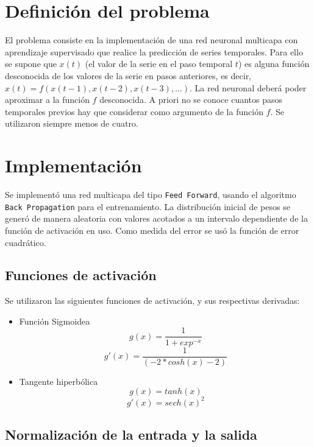 \documentclass[a4paper,10pt]{article}
\begin{document}
\setcounter{page}{1}


\section{Definición del problema}

El problema consiste en la implementación de una red neuronal multicapa con aprendizaje supervisado que realice la predicción de series temporales. Para ello se supone que $x(t)$ (el valor de la 
serie en el paso temporal $t$) es alguna función desconocida de los valores de la serie en pasos anteriores, es decir, $x(t) = f (x(t - 1), x(t - 2), x(t - 3), \dots)$. 
La red neuronal deberá poder aproximar a la función $f$ desconocida. A priori no se conoce cuantos pasos temporales previos hay que considerar como argumento 
de la función $f$. Se utilizaron siempre menos de cuatro.

\section{Implementación}

    Se implementó una red multicapa del tipo \texttt{Feed Forward}, usando el algoritmo \texttt{Back Propagation} para el entrenamiento. La distribución inicial de pesos 
    se generó de manera aleatoria con valores acotados a un intervalo dependiente de la función de activación en uso. Como medida del error se usó la función de error cuadrático.

    \subsection{Funciones de activación}
    Se utilizaron las siguientes funciones de activación, y sus respectivas derivadas:

    \begin{itemize}
        \item Función Sigmoidea
            \[ g(x) = \dfrac{1}{1 + exp^{-x}} \]
            \[ g'(x) = \dfrac{1}{(-2 * cosh(x) - 2)}\]
        \item Tangente hiperbólica
            \[ g(x) = tanh(x) \]
            \[ g'(x) = sech(x)^{2} \]
    \end{itemize}

    \subsection{Normalización de la entrada y la salida}
\end{document}
